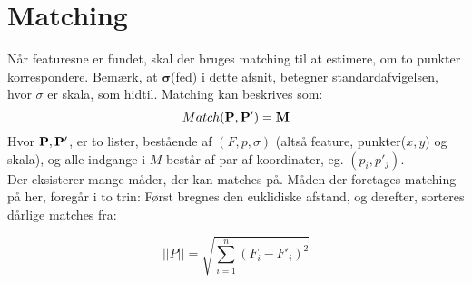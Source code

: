 \section{Matching}
Når featuresne er fundet, skal der bruges matching til at estimere, om to punkter korrespondere. Bemærk, at $\boldsymbol{\sigma}$(fed) i dette afsnit, betegner standardafvigelsen, hvor $\sigma$ er skala, som hidtil. Matching kan beskrives som:
\begin{equation}
Match(\bold{P}, \bold{P}') = \bold{M}
\end{equation}
Hvor $\bold{P}, \bold{P}'$, er to lister, bestående af $(F, p, \sigma)$ (altså feature, punkter($x,y$) og skala), og alle indgange i $M$ består af par af koordinater, eg. $(p_i, p'_j)$.
\\
Der eksisterer mange måder, der kan matches på. Måden der foretages matching på her, foregår i to trin: Først bregnes den euklidiske afstand, og derefter, sorteres dårlige matches fra:

\begin{equation}
||P|| = \sqrt{\sum\limits_{i=1}^n(F_i-F'_i)^2}
\label{euc}
\end{equation}

